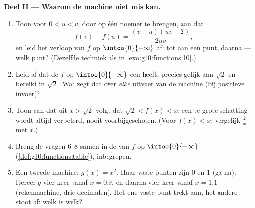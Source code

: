 \begin{problem}
\medskip
\noindent\textbf{Deel II --- Waarom de machine niet mis kan.}
\begin{enumerate}[resume]
  \item Toon voor $0 < u < v$, door op één noemer te brengen, aan dat
        \[
        f(v) - f(u) = \frac{(v - u)(uv - 2)}{2uv} ,
        \]
        en leid het verloop van $f$ op $\intoo{0}{+\infty}$ af:  tot
        aan een punt, daarna  --- welk punt? (Dezelfde techniek als
        in \cref{exo:g10:functions:10}.)
  \item Leid af dat de  $f$ op $\intoo{0}{+\infty}$ een  heeft,
        precies gelijk aan $\sqrt2$ en bereikt in $\sqrt2$. Wat zegt dat over
        \emph{elke} uitvoer van de machine (bij positieve invoer)?
  \item Toon aan dat uit $x > \sqrt2$ volgt dat $\sqrt2 < f(x) < x$: een te
        grote schatting wordt altijd verbeterd, nooit voorbijgeschoten. (Voor
        $f(x) < x$: vergelijk $\frac2x$ met $x$.)
  \item Breng de vragen 6--8 samen in de  van $f$ op
        $\intoo{0}{+\infty}$ (\cref{def:g10:functions:table}), 
        inbegrepen.
  \item Een tweede machine: $g(x) = x^2$. Haar vaste punten zijn $0$ en $1$
        (ga na). Itereer $g$ vier keer vanaf $x = 0.9$, en daarna vier keer
        vanaf $x = 1.1$ (rekenmachine, drie decimalen). Het ene vaste punt
        trekt aan, het andere stoot af: welk is welk?
\end{enumerate}


\end{problem}
